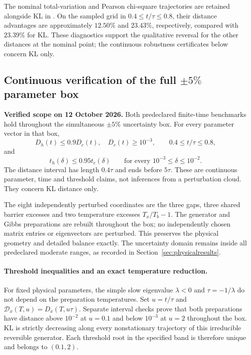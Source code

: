 \documentclass[11pt]{article}
\begin{document}
The nominal total-variation and Pearson chi-square trajectories are
retained alongside KL in .
On the sampled grid in $0.4\leq t/\tau\leq0.8$, their distance advantages
are approximately $12.50\%$ and $23.43\%$, respectively, compared with
$23.39\%$ for KL. These diagnostics support the qualitative reversal for
the other distances at the nominal point; the continuous robustness
certificates below concern KL only.


\subsection{Continuous verification of the full $\pm5\%$ parameter box}
\label{sec:physicalboxcertificate}
\textbf{Verified scope on 12 October 2026.}
Both predeclared finite-time benchmarks hold throughout the simultaneous
$\pm5\%$ uncertainty box. For every parameter vector in that box,
\[
 D_h(t)\leq0.9D_c(t),\quad D_c(t)\geq10^{-3},
 \qquad 0.4\leq t/\tau\leq0.8,
\]
and
\[
 t_h(\delta)\leq0.95t_c(\delta)
 \qquad\text{for every }10^{-3}\leq\delta\leq10^{-2}.
\]
The distance interval has length $0.4\tau$ and ends before $5\tau$.
These are continuous parameter, time and threshold claims, not inferences
from a perturbation cloud. They concern KL distance only.

The eight independently perturbed coordinates are the three gaps, three
shared barrier excesses and two temperature excesses $T_x/T_b-1$.
The generator and Gibbs preparations are rebuilt throughout the box;
no independently chosen matrix entries or eigenvectors are perturbed.
This preserves the physical geometry and detailed balance exactly.
The uncertainty domain remains inside all predeclared moderate ranges,
as recorded in Section~\ref{sec:physicalresults}.

\paragraph{Threshold inequalities and an exact temperature reduction.}
For fixed physical parameters, the simple slow eigenvalue $\lambda<0$
and $\tau=-1/\lambda$ do not depend on the preparation temperatures.
Set $u=t/\tau$ and $\mathcal D_x(T,u)=D_x(T,u\tau)$.
Separate interval checks prove that both preparations have distance
above $10^{-2}$ at $u=0.1$ and below $10^{-3}$ at $u=2$ throughout
the box. KL is strictly decreasing along every nonstationary trajectory
of this irreducible reversible generator. Each threshold root in the
specified band is therefore unique and belongs to $(0.1,2)$.
\end{document}
